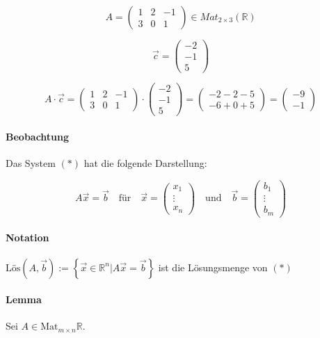 \documentclass[a4paper,12pt]{article}
\begin{document}
$$A=\begin{pmatrix}
    1 & 2 & -1 \\
    3 & 0 & 1
  \end{pmatrix}\in Mat_{2\times3}(\mathbb{R})$$

$$\vec{c}=\begin{pmatrix}
    -2 \\-1\\5
  \end{pmatrix}$$

$$A\cdot\vec{c}=\begin{pmatrix}
    1 & 2 & -1 \\
    3 & 0 & 1
  \end{pmatrix}\cdot\begin{pmatrix}
    -2 \\-1\\5
  \end{pmatrix}=\begin{pmatrix}
    -2 -2 -5 \\
    -6 + 0 + 5
  \end{pmatrix}=\begin{pmatrix}
    -9 \\
    -1
  \end{pmatrix}$$

\paragraph*{Beobachtung} Das System $(*)$ hat die folgende Darstellung:

$$A\vec{x}=\vec{b}\quad\text{für}\quad\vec{x}=\begin{pmatrix}
    x_1 \\ \vdots \\ x_n
  \end{pmatrix}\quad\text{und}\quad\vec{b}=\begin{pmatrix}
    b_1 \\ \vdots \\ b_m
  \end{pmatrix}$$

\paragraph*{Notation} $\text{Lös}(A,\vec{b}):=\left\{\vec{x}\in\mathbb{R}^n\vert A\vec{x}=\vec{b}\right\}$ ist die Lösungsmenge von $(*)$

\paragraph*{Lemma} Sei $A\in\text{Mat}_{m\times n}\mathbb{R}$.
\end{document}
